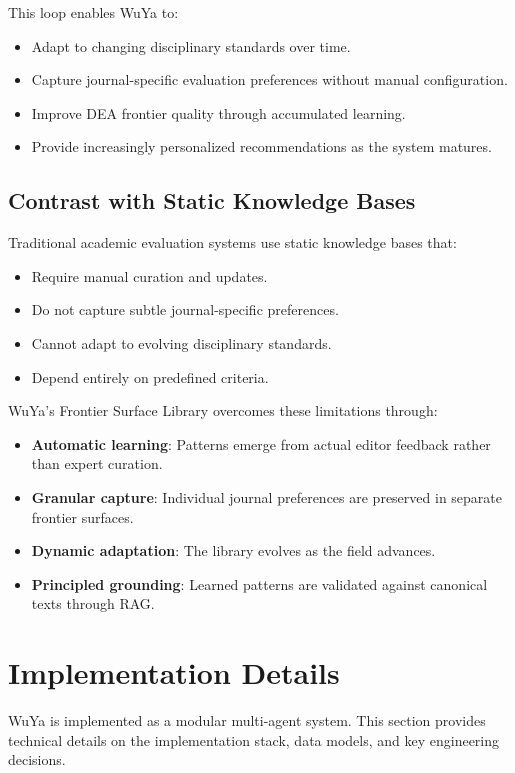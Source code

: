 \documentclass[11pt,a4paper]{article}
\newcommand{\rag}{RAG}
\newcommand{\dea}{DEA}
\begin{document}
This loop enables WuYa to:
\begin{itemize}
    \item Adapt to changing disciplinary standards over time.
    \item Capture journal-specific evaluation preferences without manual configuration.
    \item Improve \dea{} frontier quality through accumulated learning.
    \item Provide increasingly personalized recommendations as the system matures.
\end{itemize}

\subsection{Contrast with Static Knowledge Bases}

Traditional academic evaluation systems use static knowledge bases that:
\begin{itemize}
    \item Require manual curation and updates.
    \item Do not capture subtle journal-specific preferences.
    \item Cannot adapt to evolving disciplinary standards.
    \item Depend entirely on predefined criteria.
\end{itemize}

WuYa's Frontier Surface Library overcomes these limitations through:
\begin{itemize}
    \item \textbf{Automatic learning}: Patterns emerge from actual editor feedback rather than expert curation.
    \item \textbf{Granular capture}: Individual journal preferences are preserved in separate frontier surfaces.
    \item \textbf{Dynamic adaptation}: The library evolves as the field advances.
    \item \textbf{ Principled grounding}: Learned patterns are validated against canonical texts through \rag{}.
\end{itemize}

\section{Implementation Details}
\label{sec:implementation}

WuYa is implemented as a modular multi-agent system. This section provides technical details on the implementation stack, data models, and key engineering decisions.
\end{document}
